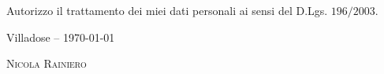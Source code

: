\documentclass[11pt,a4paper,sans]{moderncv} %
\begin{document}

\vspace{20pt}


\begin{it}
Autorizzo il trattamento dei miei dati personali ai sensi del D.Lgs. $196/2003$.

\vspace{5pt}
\end{it}

Villadose -- \today

\vspace{10pt}

\textsc{Nicola Rainiero}
\end{document}
